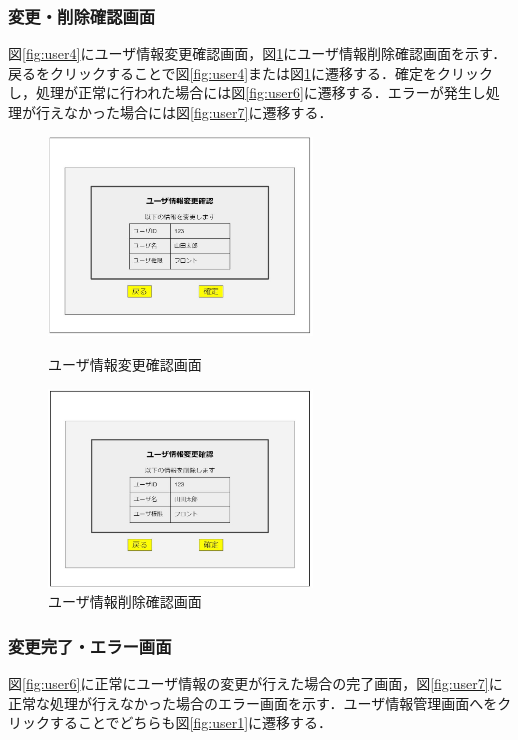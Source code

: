 \documentclass[main]{subfiles}
\begin{document}
\subsubsection{変更・削除確認画面}
図\ref{fig:user4}にユーザ情報変更確認画面，図\ref{fig:user5}にユーザ情報削除確認画面を示す．戻るをクリックすることで図\ref{fig:user4}または図\ref{fig:user5}に遷移する．確定をクリックし，処理が正常に行われた場合には図\ref{fig:user6}に遷移する．エラーが発生し処理が行えなかった場合には図\ref{fig:user7}に遷移する．

\begin{figure}[H]
    \begin{minipage}{0.5\hsize}
        \centering
        \includegraphics[width=7cm]{UI-umino/user4.JPG}
        \caption{ユーザ情報変更確認画面}
        \label{fig:user4}
    \end{minipage}
    \begin{minipage}{0.5\hsize}
        \centering
        \includegraphics[width=7cm]{UI-umino/user5.JPG}
        \caption{ユーザ情報削除確認画面}
        \label{fig:user5}
    \end{minipage} 
\end{figure}

\subsubsection{変更完了・エラー画面}
図\ref{fig:user6}に正常にユーザ情報の変更が行えた場合の完了画面，図\ref{fig:user7}に正常な処理が行えなかった場合のエラー画面を示す．ユーザ情報管理画面へをクリックすることでどちらも図\ref{fig:user1}に遷移する．
\end{document}
